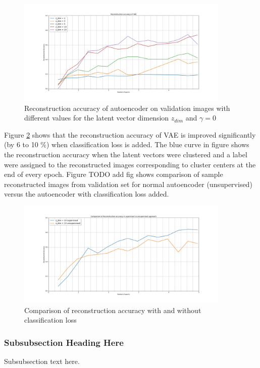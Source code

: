 \documentclass[journal]{IEEEtran}
\begin{document}
\begin{figure}[!t]
\centering
\includegraphics[width=4in]{reconstruction_accuracy.jpg}
\caption{Reconstruction accuracy of autoencoder on validation images with different values for the latent vector dimension  $z_{dim}$ and $\gamma = 0$}
\label{reconstruction_accuracy}
\end{figure}

Figure \ref{reconstruction_accuracy_sup_vs_unsup} shows that the reconstruction accuracy of VAE is improved significantly  (by 6 to 10 \%) when classification loss is added. The blue curve in figure shows the reconstruction accuracy when the latent vectors were clustered and a label were assigned to the reconstructed images corresponding to  cluster centers at the end of every epoch. Figure TODO add fig shows comparison of sample reconstructed images from validation set for normal autoencoder (unsupervised) versus the autoencoder with classification loss added.

\begin{figure}[!t]
\centering
\includegraphics[width=4in]{reconstruction_accuracy_compare_supervised_vs_unsuprevised.jpg}
\caption{Comparison of reconstruction accuracy with and without classification loss }
\label{reconstruction_accuracy_sup_vs_unsup}
\end{figure}




\subsubsection{Subsubsection Heading Here}
Subsubsection text here.
\end{document}
